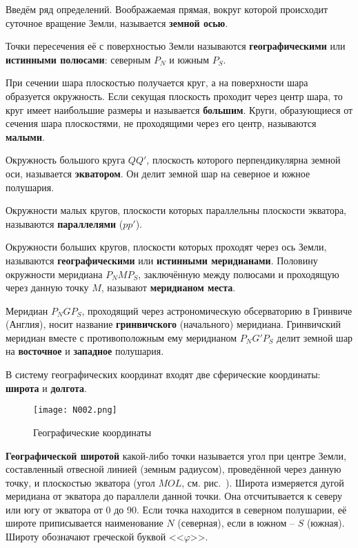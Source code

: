 Введём ряд определений. Воображаемая прямая, вокруг которой происходит
суточное вращение Земли, называется \textbf{земной осью}.

Точки пересечения её с поверхностью Земли называются
\textbf{географическими} или \textbf{истинными полюсами}: северным
$P_N$ и южным $P_S$.

При сечении шара плоскостью получается круг, а на поверхности шара
образуется окружность. Если секущая плоскость проходит через центр
шара, то круг имеет наибольшие размеры и называется
\textbf{большим}. Круги, образующиеся от сечения шара плоскостями, не
проходящими через его центр, называются \textbf{малыми}.

Окружность большого круга $QQ'$, плоскость которого перпендикулярна
земной оси, называется \textbf{экватором}. Он делит земной шар на
северное и южное полушария.

Окружности малых кругов, плоскости которых параллельны плоскости
экватора, называются \textbf{параллелями} ($pp'$).

Окружности больших кругов, плоскости которых проходят через ось Земли,
называются 
\textbf{географическими} или \textbf{истинными
  меридианами}. Половину окружности меридиана $P_NMP_S$, заключённую
между полюсами и проходящую через данную точку $M$, называют
\textbf{меридианом места}.

Меридиан $P_NGP_S$, проходящий через астрономическую обсерваторию в
Гринвиче (Англия), носит название \textbf{гринвичского} (начального)
меридиана. Гринвичский меридиан вместе с противоположным ему
меридианом $P_NG'P_S$ делит земной шар на \textbf{восточное} и
\textbf{западное} полушария.

В систему географических координат входят две сферические координаты:
 \textbf{широта} и \textbf{долгота}.

\begin{wrapfigure}{O}{0.4\textwidth}
  \centering{}
  \texttt{[image: N002.png]}
  \caption{Географические координаты}
  \label{fig:N2}
\end{wrapfigure}

\textbf{Географической широтой}
какой-либо точки называется угол при центре Земли, составленный
отвесной линией (земным радиусом), проведённой через данную точку, и
плоскостью экватора (угол $MOL$, см. рис.~). Широта измеряется
дугой меридиана от экватора до параллели данной точки. Она
отсчитывается к северу или югу от экватора от 0 до 90\gr. Если точка
находится в северном полушарии, её широте приписывается наименование
$N$ (северная), если в южном \--- $S$ (южная). Широту обозначают
греческой буквой <<$\varphi$>>.

